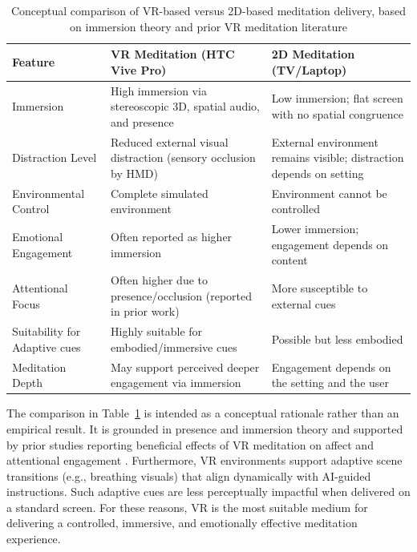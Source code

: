 \begin{table}[H]
\centering
\caption{Conceptual comparison of VR-based versus 2D-based meditation delivery, based on immersion theory and prior VR meditation literature \cite{slater2018immersive,jerald2016vrbook,tarrant2018virtual,liszio2018nature}
}
\label{tab:vr-vs-2d}
\begin{tabular}{p{4cm} p{5cm} p{5cm}}
\hline
\textbf{Feature} &
\textbf{VR Meditation (HTC Vive Pro)} &
\textbf{2D Meditation (TV/Laptop)} \\
\hline
Immersion &
High immersion via stereoscopic 3D, spatial audio, and presence &
Low immersion; flat screen with no spatial congruence \\
\hline
Distraction Level &
Reduced external visual distraction (sensory occlusion by HMD) &
External environment remains visible; distraction depends on setting \\
\hline
Environmental Control &
Complete simulated environment &
Environment cannot be controlled \\
\hline
Emotional Engagement &
Often reported as higher immersion &
Lower immersion; engagement depends on content \\
\hline
Attentional Focus &
Often higher due to presence/occlusion (reported in prior work) &
More susceptible to external cues \\
\hline
Suitability for Adaptive cues &
Highly suitable for embodied/immersive cues &
Possible but less embodied\\
\hline
Meditation Depth &
May support perceived deeper engagement via immersion &
Engagement depends on the setting and the user \\
\hline
\end{tabular}
\end{table}

The comparison in Table~\ref{tab:vr-vs-2d} is intended as a conceptual rationale rather than an empirical result.
It is grounded in presence and immersion theory \cite{slater2018immersive,jerald2016vrbook} and supported by prior studies reporting beneficial effects of VR meditation on affect and attentional engagement \cite{tarrant2018virtual,liszio2018nature}.
Furthermore, VR environments support adaptive scene transitions (e.g., breathing visuals) that align dynamically with AI-guided instructions. Such adaptive cues are less perceptually impactful when delivered on a standard screen. For these reasons, VR is the most suitable medium for delivering a controlled, immersive, and emotionally effective meditation experience.


